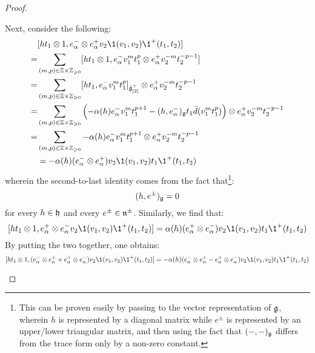 \begin{proof}
\begin{enumerate}
\begin{enumerate}
                            Next, consider the following:
                                $$
                                    \begin{aligned}
                                        & [ht_1 \tensor 1, e_{\alpha}^- \tensor e_{\alpha}^+ v_2\1(v_1, v_2) \1^+(t_1, t_2)]
                                        \\
                                        = & \sum_{(m, p) \in \Z \x \Z_{\geq 0}} [ht_1 \tensor 1, e_{\alpha}^- v_1^m t_1^p \tensor e_{\alpha}^+ v_2^{-m} t_2^{-p - 1}]
                                        \\
                                        = & \sum_{(m, p) \in \Z \x \Z_{\geq 0}} [ht_1, e_{\alpha}^- v_1^m t_1^p]_{\tilde{\g}_{[2]}^+} \tensor e_{\alpha}^+ v_2^{-m} t_2^{-p - 1}
                                        \\
                                        = & \sum_{(m, p) \in \Z \x \Z_{\geq 0}} \left( -\alpha(h) e_{\alpha}^- v_1^m t_1^{p + 1} - (h, e_{\alpha}^-)_{\g} t_1 \bar{d}(v_1^m t_1^p) \right) \tensor e_{\alpha}^+ v_2^{-m} t_2^{-p - 1}
                                        \\
                                        = & \sum_{(m, p) \in \Z \x \Z_{\geq 0}} -\alpha(h) e_{\alpha}^- v_1^m t_1^{p + 1} \tensor e_{\alpha}^+ v_2^{-m} t_2^{-p - 1}
                                        \\
                                        & = -\alpha(h) ( e_{\alpha}^- \tensor e_{\alpha}^+ ) v_2 \1(v_1, v_2) t_1 \1^+(t_1, t_2)
                                    \end{aligned}    
                                $$
                            wherein the second-to-last identity comes from the fact that\footnote{This can be proven easily by passing to the vector representation of $\mathfrak{g}$, wherein $h$ is represented by a diagonal matrix while $e^{\pm}$ is represented by an upper/lower triangular matrix, and then using the fact that $(-, -)_{\mathfrak{g}}$ differs from the trace form only by a non-zero constant.}:
                                $$(h, e^{\pm})_{\mathfrak{g}} = 0$$
                            for every $h \in \mathfrak{h}$ and every $e^{\pm} \in \mathfrak{n}^{\pm}$. Similarly, we find that:
                                $$[ht_1 \tensor 1, e_{\alpha}^+ \tensor e_{\alpha}^- v_2\1(v_1, v_2) \1^+(t_1, t_2)] = \alpha(h) ( e_{\alpha}^+ \tensor e_{\alpha}^- ) v_2 \1(v_1, v_2) t_1 \1^+(t_1, t_2)$$
                            By putting the two together, one obtains:
                                $$[h t_1 \tensor 1, (e_{\alpha}^- \tensor e_{\alpha}^+ + e_{\alpha}^+ \tensor e_{\alpha}^-) v_2\1(v_1, v_2) \1^+(t_1, t_2)] = -\alpha(h) ( e_{\alpha}^- \tensor e_{\alpha}^+ - e_{\alpha}^+ \tensor e_{\alpha}^- ) v_2 \1(v_1, v_2) t_1 \1^+(t_1, t_2)$$

\end{enumerate}
\end{enumerate}
\end{proof}
